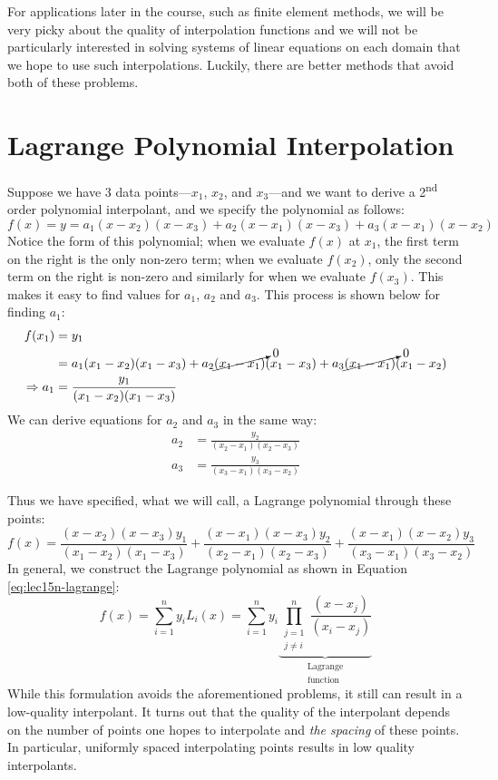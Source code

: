 \noindent For applications later in the course, such as finite element methods, we will be very picky about the quality of interpolation functions and we will not be particularly interested in solving systems of linear equations on each domain that we hope to use such interpolations.  Luckily, there are better methods that avoid both of these problems.

\section{Lagrange Polynomial Interpolation}

Suppose we have 3 data points---$x_1$, $x_2$, and $x_3$---and we want to derive a 2\textsuperscript{nd} order polynomial interpolant, and we specify the polynomial as follows:
\begin{equation*}
f(x) = y = a_1(x-x_2)(x-x_3) + a_2(x-x_1)(x-x_3) + a_3(x-x_1)(x-x_2)
\end{equation*}
Notice the form of this polynomial; when we evaluate $f(x)$ at $x_1$, the first term on the right is the only non-zero term; when we evaluate $f(x_2)$, only the second term on the right is non-zero and similarly for when we evaluate $f(x_3)$.  This makes it easy to find values for $a_1$, $a_2$ and $a_3$.  This process is shown below for finding $a_1$:
\begin{align*}
f(x_1) &= y_1 \\
&=a_1(x_1 - x_2)(x_1 - x_3) + a_2 \cancelto{0}{(x_1 - x_1)}(x_1 - x_3) + a_3\cancelto{0}{(x_1 - x_1)}(x_1 - x_2) \\
\Rightarrow a_1 &= \frac{y_1}{(x_1 - x_2)(x_1 - x_3)} 
\end{align*}
We can derive equations for $a_2$ and $a_3$ in the same way:
\begin{align*}
a_2 & = \frac{y_2}{(x_2 - x_1)(x_2 - x_3)} \\
a_3 & = \frac{y_3}{(x_3 - x_1)(x_3 - x_2)}
\end{align*}

\noindent Thus we have specified, what we will call, a Lagrange polynomial through these points:
\begin{equation*}
f(x) = \frac{(x - x_2)(x - x_3)y_1}{(x_1 - x_2)(x_1 - x_3)} + \frac{(x - x_1)(x-x_3)y_2}{(x_2 - x_1)(x_2 - x_3)} + \frac{(x - x_1)(x-x_2)y_3}{(x_3-x_1)(x_3 - x_2)}
\end{equation*}
In general, we construct the Lagrange polynomial as shown in Equation \ref{eq:lec15n-lagrange}:
\begin{equation}
f(x) = \sum\limits_{i=1}^{n} y_i L_i(x) = \sum\limits_{i=1}^{n} y_i \underbrace{\prod_{\substack{j=1 \\ j \ne i}}^{n} \frac{(x - x_j)}{(x_i - x_j)}}_{\substack{\text{Lagrange} \\ \text{function}}}
\label{eq:lec15n-lagrange}
\end{equation}
While this formulation avoids the aforementioned problems, it still can result in a low-quality interpolant.  It turns out that the quality of the interpolant depends on the number of points one hopes to interpolate and \emph{the spacing} of these points.  In particular, uniformly spaced interpolating points results in low quality interpolants.

